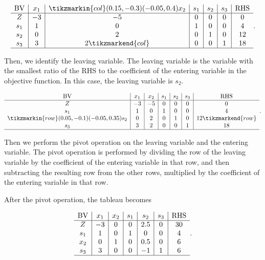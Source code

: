 \documentclass{report}
\begin{document}
\[
	\begin{array}{c|c|c|c|c|c|c}
		\text{BV} & x_1 & \tikzmarkin{col}(0.15,-0.3)(-0.05,0.4)x_2 & s_1 & s_2 & s_3 & \text{RHS} \\
		\hline
		Z         & -3  & -5                                        & 0   & 0   & 0   & 0          \\
		s_1       & 1   & 0                                         & 1   & 0   & 0   & 4          \\
		s_2       & 0   & 2                                         & 0   & 1   & 0   & 12         \\
		s_3       & 3   & 2 \tikzmarkend{col}                       & 0   & 0   & 1   & 18         \\
		\hline
	\end{array}
	.\]


Then, we identify the leaving variable. The leaving variable is the variable with the smallest ratio of the RHS to the coefficient of the entering variable in the objective function.
In this case, the leaving variable is $s_2$.

\[
	\begin{array}{c|c|c|c|c|c|c}
		\text{BV}                                  & x_1 & x_2 & s_1 & s_2 & s_3 & \text{RHS}           \\
		\hline
		Z                                          & -3  & -5  & 0   & 0   & 0   & 0                    \\
		s_1                                        & 1   & 0   & 1   & 0   & 0   & 4                    \\
		\tikzmarkin{row}(0.05,-0.1)(-0.05,0.35)s_2 & 0   & 2   & 0   & 1   & 0   & 12 \tikzmarkend{row} \\
		s_3                                        & 3   & 2   & 0   & 0   & 1   & 18                   \\
		\hline
	\end{array}
	.\]


Then we perform the pivot operation on the leaving variable and the entering variable. The pivot operation is performed by dividing the row of the leaving variable by the coefficient of the entering variable in that row, and then subtracting the resulting row from the other rows, multiplied by the coefficient of the entering variable in that row.

After the pivot operation, the tableau becomes

\[
	\begin{array}{c|c|c|c|c|c|c}
		\text{BV} & x_1 & x_2 & s_1 & s_2 & s_3 & \text{RHS} \\
		\hline
		Z         & -3  & 0   & 0   & 2.5 & 0   & 30         \\
		s_1       & 1   & 0   & 1   & 0   & 0   & 4          \\
		x_2       & 0   & 1   & 0   & 0.5 & 0   & 6          \\
		s_3       & 3   & 0   & 0   & -1  & 1   & 6          \\
		\hline
	\end{array}
	.\]
\end{document}
